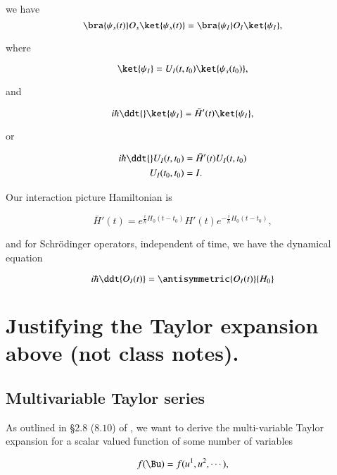 we have
\begin{equation}\label{eqn:qmTwoL6:880b}
\bra{\psi_s(t)} O_s \ket{\psi_s(t)} =
\bra{\psi_I} 
O_I
\ket{\psi_I},
\end{equation}

where

\begin{equation}\label{eqn:qmTwoL6:920}
\ket{\psi_I} 
= U_I(t, t_0) \ket{\psi_s(t_0)},
\end{equation}

and

\begin{equation}\label{eqn:qmTwoL6:820b}
i \hbar \ddt{} 
\ket{\psi_I} 
= \bar{H}'(t) 
\ket{\psi_I},
\end{equation}

or

\begin{align}\label{eqn:qmTwoL6:740b}
i \hbar \ddt{} U_I(t, t_0) &= \bar{H}'(t) U_I(t, t_0) \\
U_I(t_0, t_0) &= I.
\end{align}

Our interaction picture Hamiltonian is

\begin{equation}\label{eqn:qmTwoL6:720b}
\bar{H}'(t) =
e^{\frac{i}{\hbar} H_0(t - t_0)} H'(t) e^{-\frac{i}{\hbar} H_0(t - t_0)},
\end{equation}

and for Schr\"{o}dinger operators, independent of time, we have the dynamical equation

\begin{equation}\label{eqn:qmTwoL6:900b}
i \hbar \ddt{O_I(t)} = \antisymmetric{O_I(t)}{H_0}
\end{equation}

\section{Justifying the Taylor expansion above (not class notes).}

\subsection{Multivariable Taylor series}

As outlined in \S 2.8 ($8.10$) of \cite{hestenes1999nfc}, we want to derive the multi-variable Taylor expansion for a scalar valued function of some number of variables

\begin{equation}\label{eqn:qmTwoL6:210}
f(\Bu) = f(u^1, u^2, \cdots),
\end{equation}

